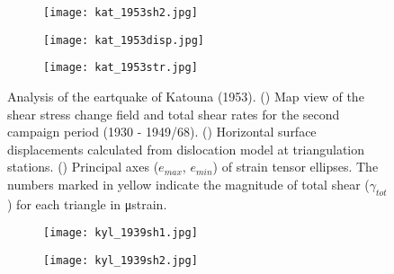 \begin{extsum}
\begin{figure}[H]
\centering
\begin{subfigure}{.5\textwidth}
  \centering
      \texttt{[image: kat\_1953sh2.jpg]}
      \caption{}
      \label{fig_e:kat_1953sh2}
\end{subfigure}

\begin{subfigure}{.49\textwidth}
  \centering
      \texttt{[image: kat\_1953disp.jpg]}
      \caption{}
      \label{fig_e:kat_1953disp}
\end{subfigure}
\begin{subfigure}{.49\textwidth}
\centering
      \texttt{[image: kat\_1953str.jpg]}
      \caption{}
      \label{fig_e:kat_1953str}
\end{subfigure}
\caption{Analysis of the eartquake of Katouna (1953). () Map view of the shear stress change field and total shear rates for the second campaign period (1930 - 1949/68). () Horizontal surface displacements calculated from \citet{Okada1985} dislocation model at triangulation stations. () Principal axes (${e}_{max}$, ${e}_{min}$) of strain tensor ellipses. The numbers marked in yellow indicate the magnitude of total shear ($\gamma_{tot}$) for each triangle in μstrain.}
\label{fig_e:kat_1953}
\end{figure}

\begin{figure}[H]
\centering
\begin{subfigure}{.49\textwidth}
  \centering
      \texttt{[image: kyl\_1939sh1.jpg]}
      \caption{}
      \label{fig_e:kyl_1939sh1}
\end{subfigure}
\begin{subfigure}{.49\textwidth}
\centering
      \texttt{[image: kyl\_1939sh2.jpg]}
      \caption{}
      \label{fig_e:kyl_1939sh2}
\end{subfigure}


\end{figure}
\end{extsum}
